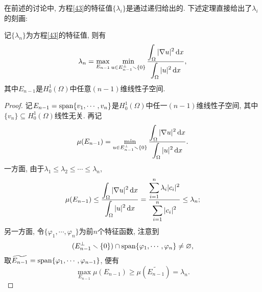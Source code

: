 在前述的讨论中, 方程\eqref{43}的特征值$\{\lambda_i\}$是通过递归给出的.
下述定理直接给出了$\lambda_i$的刻画:

\begin{theorem}[Courant极小极大定理]
    记$\{\lambda_n\}$为方程\eqref{43}的特征值, 则有 
    \begin{equation*}
        \lambda_n = \max_{E_{n - 1}}\min_{u \in E_{n - 1}^{\bot} \smallsetminus \{0\}}\frac{\displaystyle\int_{\Omega}|\nabla u|^2 \,{\rm d}x}{\displaystyle \int_{\Omega}|u|^2 \,{\rm d}x},
    \end{equation*}
    其中$E_{n - 1}$是$H_0^1(\Omega)$中任意$(n - 1)$维线性子空间.
    \begin{proof}
        记$E_{n - 1} = {\rm span}\{v_1, \cdots, v_n\}$是$H_0^1(\Omega)$中任一$(n - 1)$维线性子空间, 其中$\{v_n\} \subseteq H_0^1(\Omega)$线性无关.
        再记 
        \begin{equation*}
            \mu(E_{n - 1}) = \min_{u \in E_{n - 1}^{\bot} \smallsetminus \{0\}}\frac{\displaystyle\int_{\Omega}|\nabla u|^2 \,{\rm d}x}{\displaystyle \int_{\Omega}|u|^2 \,{\rm d}x}.
        \end{equation*}
        一方面, 由于$\lambda_1 \leq \lambda_2 \leq \cdots \leq \lambda_n$, 
        \begin{equation*}
            \mu(E_{n - 1}) \leq \frac{\displaystyle\int_{\Omega}|\nabla u|^2 \,{\rm d}x}{\displaystyle \int_{\Omega}|u|^2 \,{\rm d}x} = \frac{\displaystyle\sum_{i = 1}^n\lambda_i|c_i|^2}{\displaystyle\sum_{i = 1}^n|c_i|^2} \leq \lambda_n;
        \end{equation*}
        另一方面, 令$\{\varphi_1, \cdots, \varphi_n\}$为前$n$个特征函数, 注意到 
        \begin{equation*}
            (E_{n - 1}^{\bot} \smallsetminus \{0\}) \cap {\rm span}\{\varphi_1, \cdots, \varphi_n\} \neq \varnothing,
        \end{equation*}
        取$\widetilde{E_{n - 1}} = {\rm span}\{\varphi_1, \cdots, \varphi_{n - 1}\}$, 便有 
        \begin{equation*}
            \max_{E_{n - 1}}\mu(E_{n - 1}) \geq \mu(\widetilde{E_{n - 1}}) = \lambda_n.
        \end{equation*}
    \end{proof}
\end{theorem}

